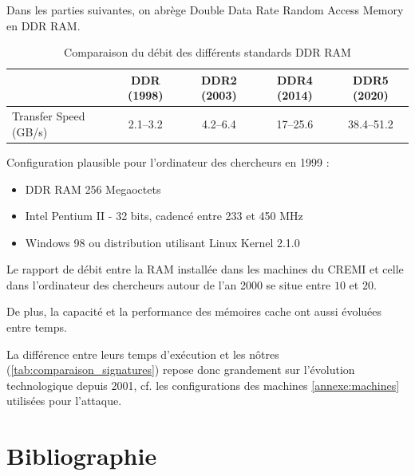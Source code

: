 \documentclass{backend}
\begin{document}
Dans les parties suivantes, on abrège Double Data Rate Random Access Memory en DDR RAM.

\begin{table}[H]
    \centering
    \caption{Comparaison du débit des différents standards DDR RAM\cite{ram}}
    \begin{tabular}{|l|c|c|c|c|}
        \toprule
        & DDR (1998) & DDR2 (2003) & DDR4 (2014) & DDR5 (2020) \\
        \midrule
        Transfer Speed (GB/s) & 2.1–3.2 & 4.2–6.4 & 17–25.6 & 38.4–51.2 \\
        \bottomrule
    \end{tabular}
    
    \label{tab:ddr_comparaison}
\end{table}


Configuration plausible pour l'ordinateur des chercheurs en 1999 :
\begin{itemize}
    \item DDR RAM 256 Megaoctets
    \item Intel Pentium II - 32 bits, cadencé entre 233 et 450 MHz %
    \item Windows 98 ou distribution utilisant Linux Kernel 2.1.0
\end{itemize}

Le rapport de débit entre la RAM installée dans les machines du CREMI et celle dans l'ordinateur des chercheurs autour de l'an 2000 se situe entre $10$ et $20$.

De plus, la capacité et la performance des mémoires cache ont aussi évoluées entre temps.

La différence entre leurs temps d'exécution et les nôtres (\ref{tab:comparaison_signatures}) repose donc grandement sur l'évolution technologique depuis 2001, cf. les configurations des machines \ref{annexe:machines} utilisées pour l'attaque. \medbreak


\newpage

\section{Bibliographie}


\printbibliography[heading=none]
\end{document}
